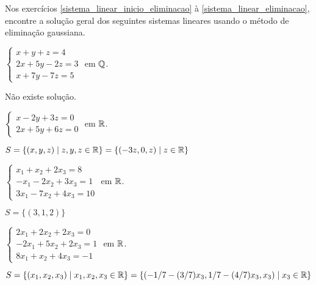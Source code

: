 \documentclass[12pt]{exam}
\begin{document}
Nos exercícios \ref{sistema_linear_inicio_eliminacao} à \ref{sistema_linear_eliminacao}, encontre a solução geral dos seguintes sistemas lineares usando o método de eliminação gaussiana.
\begin{exercicio}\label{sistema_linear_inicio_eliminacao}
  $
    \begin{cases}
      x + y + z = 4\\
      2x + 5y - 2z = 3\\
      x + 7y - 7z = 5
    \end{cases}
  $
  em $\mathbb{Q}$.
  \begin{solucao}
    Não existe solução.
  \end{solucao}
\end{exercicio}

\begin{exercicio}
  $
    \begin{cases}
      x - 2y + 3z = 0\\
      2x + 5y + 6z = 0
    \end{cases}
  $
  em $\mathbb{R}$.
  \begin{solucao}
    $S = \{(x, y, z) \mid z, y, z \in \mathbb{R}\} = \{(-3z, 0, z) \mid z \in \mathbb{R}\}$
  \end{solucao}
\end{exercicio}

\begin{exercicio}
  $
    \begin{cases}
      x_1 + x_2 + 2x_3 = 8\\
      -x_1 - 2x_2 + 3x_3 = 1\\
      3x_1 - 7x_2 + 4x_3 = 10
    \end{cases}
  $
  em $\mathbb{R}$.
  \begin{solucao}
    $S = \{(3, 1, 2)\}$
  \end{solucao}
\end{exercicio}

\begin{exercicio}
  $
    \begin{cases}
      2x_1 + 2x_2 + 2x_3 = 0\\
      -2x_1 + 5x_2 + 2x_3 = 1\\
      8x_1 + x_2 + 4x_3 = -1
    \end{cases}
  $
  em $\mathbb{R}$.
  \begin{solucao}
    $S = \{(x_1, x_2, x_3) \mid x_1, x_2, x_3 \in \mathbb{R}\} = \{(-1/7 - (3/7)x_3, 1/7 - (4/7)x_3, x_3) \mid x_3 \in \mathbb{R}\}$
  \end{solucao}
\end{exercicio}
\end{document}
